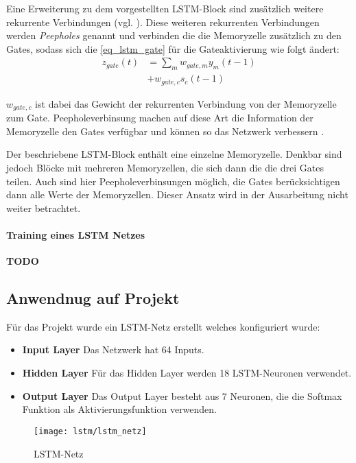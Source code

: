 Eine Erweiterung zu dem vorgestellten \ac{LSTM}-Block sind zusätzlich weitere
rekurrente Verbindungen (vgl. \cite{Gers2002b}). Diese weiteren rekurrenten
Verbindungen werden \textit{Peepholes} genannt und verbinden die die Memoryzelle
zusätzlich zu den Gates, sodass sich die \autoref{eq_lstm_gate} für die Gateaktivierung
wie folgt ändert:
\begin{equation}
\label{eq_lstm_gate_peephole}
\begin{split}
z_{gate}(t) &= \sum \limits_{m} w_{gate,m}y_m(t-1) \\
			&+ w_{gate,c} s_c(t-1)
\end{split}
\end{equation}

$w_{gate,c}$ ist dabei das Gewicht der rekurrenten Verbindung von der
Memoryzelle zum Gate. Peepholeverbinsung machen auf diese Art die Information
der Memoryzelle den Gates verfügbar und können so das Netzwerk verbessern
\cite{Gers2002b}. 

Der beschriebene \ac{LSTM}-Block enthält eine einzelne Memoryzelle. Denkbar sind
jedoch Blöcke mit mehreren Memoryzellen, die sich dann die die drei Gates
teilen. Auch sind hier Peepholeverbinsungen möglich, die Gates berücksichtigen
dann alle Werte der Memoryzellen. Dieser Ansatz wird in der Ausarbeitung nicht
weiter betrachtet. 

\paragraph{Training eines \ac{LSTM} Netzes}
\textbf{TODO}
\cite{RainerSchmoll2006}
\subsection{Anwendnug auf Projekt}
Für das Projekt wurde ein LSTM-Netz erstellt welches konfiguriert wurde:
 
\begin{itemize}
\item \textbf{Input Layer} Das Netzwerk hat 64 Inputs.
\item \textbf{Hidden Layer} Für das Hidden Layer werden 18 LSTM-Neuronen verwendet.
\item \textbf{Output Layer} Das Output Layer besteht aus 7 Neuronen, die die 
Softmax Funktion als Aktivierungsfunktion verwenden.
\end{itemize}

\begin{figure}[htbp]
    \centering
   \texttt{[image: lstm/lstm\_netz]}
\caption{LSTM-Netz}
\label{fig:lstm_netz}
\end{figure}



